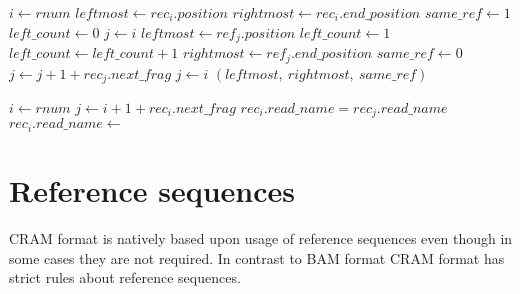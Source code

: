 \documentclass[a4paper]{article}
\makeatletter
\newcommand*{\bitand}{%
  \nonscript\mskip-\medmuskip\mkern5mu%
  \mathbin{\operator@font AND}\penalty900\mkern5mu%
  \nonscript\mskip-\medmuskip
}
\makeatother
\begin{document}
\begin{algorithmic}[1]
  \State $i \gets rnum$
  \State $leftmost \gets rec_i.position$
  \State $rightmost \gets rec_i.end\_position$
  \State $same\_ref \gets 1$
  \State $left\_count \gets 0$
  \State $j \gets i$
  \Repeat
      \State $leftmost \gets ref_j.position$
      \State $left\_count \gets 1$
      \State $left\_count \gets left\_count + 1$
    \EndIf
      \State $rightmost \gets ref_j.end\_position$
    \EndIf
      \State $same\_ref \gets 0$
    \EndIf
      \State $j \gets j + 1 + rec_j.next\_frag$
    \Else
      \State $j \gets i$
    \EndIf
  \Return $(leftmost,\ rightmost, \ same\_ref)$
\EndFunction
\end{algorithmic}

\begin{algorithmic}[1]
  \State $i \gets rnum$
    \If{$rec_i.cram\_flag \bitand 4$}
       \State $j \gets i + 1 + rec_i.next\_frag$
       \State $rec_i.read\_name = rec_j.read\_name$
    \EndIf
  \EndIf
    \State $rec_i.read\_name \gets$ 
  \EndIf
\EndProcedure
\end{algorithmic}

\section{\textbf{Reference sequences}}

CRAM format is natively based upon usage of reference sequences even though in 
some cases they are not required. In contrast to BAM format CRAM format has strict 
rules about reference sequences. 
\end{document}
